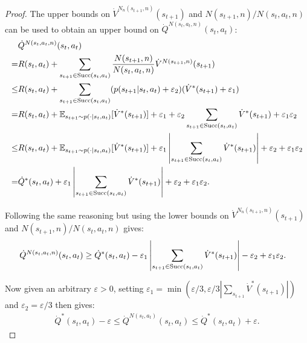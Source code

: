 \begin{proof}
        The upper bounds on $\dot{V}^{N_n(s_{t+1},n)}(s_{t+1})$ and $N(s_{t+1},n)/N(s_t,a_t,n)$ can be used to obtain an upper bound on $\dot{Q}^{N(s_t,a_t,n)}(s_t,a_t)$: 
        \begin{align}
            &\dot{Q}^{N(s_t,a_t,n)}(s_t,a_t) \\
                =& R(s_t,a_t) 
                    + \sum_{s_{t+1}\in{\textnormal{Succ}(s_t,a_t)}}\frac{N(s_{t+1},n)}{N(s_t,a_t,n)} 
                        \dot{V}^{N(s_{t+1},n)}(s_{t+1}) \\
                \leq& R(s_t,a_t) 
                    + \sum_{s_{t+1}\in{\textnormal{Succ}(s_t,a_t)}}(p(s_{t+1}|s_t,a_t)+\varepsilon_2)
                        (\dot{V}^*(s_{t+1})+\varepsilon_1) \\
                =& R(s_t,a_t) 
                    + \mathbb{E}_{s_{t+1}\sim p(\cdot|s_t,a_t)}[\dot{V}^*(s_{t+1})] 
                    + \varepsilon_1 
                    + \varepsilon_2\sum_{s_{t+1}\in{\textnormal{Succ}(s_t,a_t)}} \dot{V}^*(s_{t+1}) 
                    + \varepsilon_1 \varepsilon_2 \\
                \leq& R(s_t,a_t) 
                    + \mathbb{E}_{s_{t+1}\sim p(\cdot|s_t,a_t)}[\dot{V}^*(s_{t+1})] 
                    + \varepsilon_1\left|\sum_{s_{t+1}\in{\textnormal{Succ}(s_t,a_t)}} \dot{V}^*(s_{t+1})\right| 
                    + \varepsilon_2 + \varepsilon_1 \varepsilon_2 \\
                =& \dot{Q}^*(s_t,a_t) 
                    + \varepsilon_1\left|\sum_{s_{t+1}\in{\textnormal{Succ}(s_t,a_t)}} \dot{V}^*(s_{t+1})\right| 
                    + \varepsilon_2 
                    + \varepsilon_1 \varepsilon_2.
        \end{align}
        
        Following the same reasoning but using the lower bounds on $\dot{V}^{N_n(s_{t+1},n)}(s_{t+1})$ and $N(s_{t+1},n)/N(s_t,a_t,n)$ gives:
        \begin{align}
            \dot{Q}^{N(s_t,a_t,n)}(s_t,a_t) 
                &\geq \dot{Q}^*(s_t,a_t) 
                    - \varepsilon_1\left|\sum_{s_{t+1}\in{\textnormal{Succ}(s_t,a_t)}} \dot{V}^*(s_{t+1})\right| 
                    - \varepsilon_2 
                    + \varepsilon_1 \varepsilon_2.
        \end{align}
        
        Now given an arbitrary $\varepsilon >0$, setting $\varepsilon_1 = \min(\varepsilon/3, \varepsilon/3|\sum_{s_{t+1}} \dot{V}^*(s_{t+1})|)$ and $\varepsilon_2 = \varepsilon/3$ then gives:
        \begin{align}
            \dot{Q}^*(s_t,a_t) - \varepsilon \leq \dot{Q}^{N(s_t,a_t)}(s_t,a_t) \leq \dot{Q}^*(s_t,a_t) + \varepsilon.
        \end{align}
        

\end{proof}
